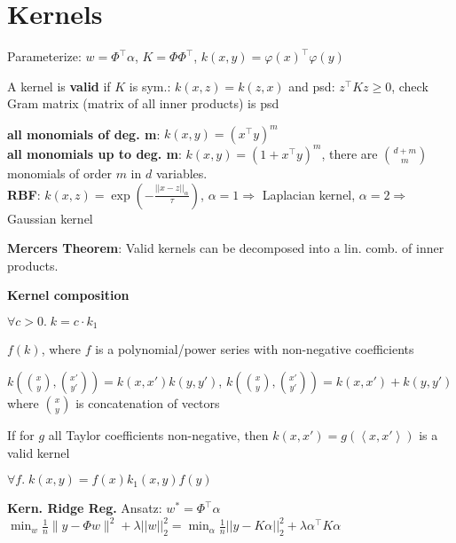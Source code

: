 \section*{Kernels}

Parameterize: $w = \Phi^\top \alpha$, $K = \Phi \Phi^\top$, $k(x,y) = \varphi(x)^\top \varphi(y)$

A kernel is \textbf{valid} if $K$ is sym.: $k(x,z) = k(z,x)$ and psd: $z^\top K z \geq 0$, check Gram matrix (matrix of all inner products) is psd

\textbf{all monomials of deg. m}: $k(x,y) = (x^\top y)^m$ \\
\textbf{all monomials up to deg. m}: $k(x,y) = (1+x^\top y)^m$, there are $\binom{d+m}{m}$ monomials of 
order $m$ in $d$ variables.\\

\textbf{RBF}: $k(x, z) = \exp ( -\frac{||x - z||_\alpha}{\tau} )$, $\alpha = 1 \Rightarrow $ Laplacian kernel, $\alpha = 2 \Rightarrow $ Gaussian kernel

\textbf{Mercers Theorem}: Valid kernels can be decomposed into a lin. comb. of inner products.

\textbf{Kernel composition}

\begin{rowlist}
    \item $\forall c > 0. \; k = c \cdot k_1$
    \item $f(k)$, where $f$ is a polynomial/power series with non-negative coefficients
    \item{
        $k(\binom{x}{y}, \binom{x'}{y'})=k(x,x')k(y,y')$, $k(\binom{x}{y}, \binom{x'}{y'})=k(x,x') + k(y,y')$ where $\binom{x}{y}$ is concatenation of vectors
    }
    \item If for $g$ all Taylor coefficients non-negative, then $k(x, x') = g(\left< x, x' \right>)$ is a valid kernel
    \item $\forall f. \; k(x,y) = f(x)k_1(x,y)f(y)$
\end{rowlist}

\textbf{Kern. Ridge Reg.}
Ansatz: $w^*=\Phi^\top\alpha$\\
$\min_w \frac1n \|y - \Phi w\|^2 + \lambda ||w||_2^2 = \min_\alpha \frac1n ||y - K\alpha||_2^2 + \lambda \alpha^\top K \alpha$
